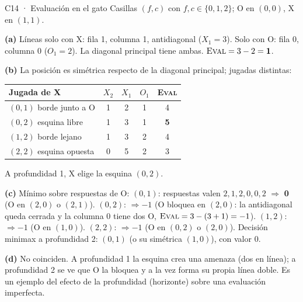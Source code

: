 \begin{solucion}{C14 · Evaluación en el gato}
Casillas $(f,c)$ con $f,c\in\{0,1,2\}$; O en $(0,0)$, X en $(1,1)$.

\textbf{(a)} Líneas solo con X: fila 1, columna 1, antidiagonal ($X_1=3$). Solo con O: fila 0, columna 0
($O_1=2$). La diagonal principal tiene ambas. $\textsc{Eval}=3-2=\mathbf{1}$.

\textbf{(b)} La posición es simétrica respecto de la diagonal principal; jugadas distintas:
\begin{center}\small
\begin{tabular}{lcccc}
\toprule
Jugada de X & $X_2$ & $X_1$ & $O_1$ & \textsc{Eval}\\
\midrule
$(0,1)$ borde junto a O & 1 & 2 & 1 & 4\\
$(0,2)$ esquina libre & 1 & 3 & 1 & \textbf{5}\\
$(1,2)$ borde lejano & 1 & 3 & 2 & 4\\
$(2,2)$ esquina opuesta & 0 & 5 & 2 & 3\\
\bottomrule
\end{tabular}
\end{center}
A profundidad 1, X elige la esquina $(0,2)$.

\textbf{(c)} Mínimo sobre respuestas de O: $(0,1)$: respuestas valen $2,1,2,0,0,2$ $\Rightarrow$ \textbf{0} (O en
$(2,0)$ o $(2,1)$). $(0,2)$: $\Rightarrow-1$ (O bloquea en $(2,0)$: la antidiagonal queda cerrada y la columna 0 tiene dos O, $\textsc{Eval}=3-(3+1)=-1$). $(1,2)$: $\Rightarrow-1$ (O en $(1,0)$). $(2,2)$: $\Rightarrow-1$ (O en $(0,2)$ o $(2,0)$).
Decisión minimax a profundidad 2: \textbf{$(0,1)$} (o su simétrica $(1,0)$), con valor 0.

\textbf{(d)} No coinciden. A profundidad 1 la esquina crea una amenaza (dos en línea); a profundidad 2
se ve que O la bloquea y a la vez forma su propia línea doble. Es un ejemplo del efecto de la
profundidad (horizonte) sobre una evaluación imperfecta.
\end{solucion}

